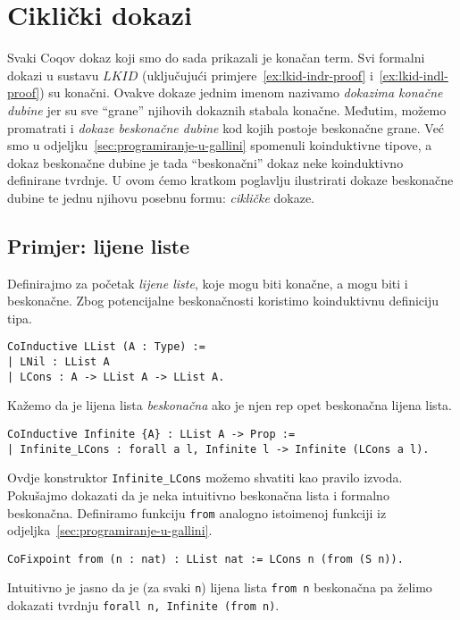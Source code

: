 \chapter{Ciklički dokazi}\label{cha:cikliki-dokazi}
Svaki Coqov dokaz koji smo do sada prikazali je konačan term.
Svi formalni dokazi u sustavu \(\mathit{LKID}\) (uključujući primjere~\ref{ex:lkid-indr-proof} i~\ref{ex:lkid-indl-proof}) su konačni.
Ovakve dokaze jednim imenom nazivamo \textit{dokazima konačne dubine}
jer su sve \enquote{grane} njihovih dokaznih stabala konačne.
Međutim, možemo promatrati i \textit{dokaze beskonačne dubine} kod kojih postoje beskonačne grane.
Već smo u odjeljku~\ref{sec:programiranje-u-gallini} spomenuli koinduktivne tipove,
a dokaz beskonačne dubine je tada \enquote{beskonačni} dokaz neke koinduktivno definirane tvrdnje.
U ovom ćemo kratkom poglavlju ilustrirati dokaze beskonačne dubine te jednu njihovu posebnu formu:
\textit{cikličke} dokaze.

\section{Primjer: lijene liste}
Definirajmo za početak \textit{lijene liste}, koje mogu biti konačne, a mogu biti i beskonačne.
Zbog potencijalne beskonačnosti koristimo koinduktivnu definiciju tipa.
\begin{verbatim}
CoInductive LList (A : Type) :=
| LNil : LList A
| LCons : A -> LList A -> LList A.
\end{verbatim}
\noindent Kažemo da je lijena lista \textit{beskonačna} ako je njen rep opet beskonačna lijena lista.
\begin{verbatim}
CoInductive Infinite {A} : LList A -> Prop :=
| Infinite_LCons : forall a l, Infinite l -> Infinite (LCons a l).
\end{verbatim}
\noindent Ovdje konstruktor \texttt{Infinite\_LCons} možemo shvatiti kao pravilo izvoda.
Pokušajmo dokazati da je neka intuitivno beskonačna lista i formalno beskonačna.
Definiramo funkciju \texttt{from} analogno istoimenoj funkciji iz odjeljka~\ref{sec:programiranje-u-gallini}.
\begin{verbatim}
CoFixpoint from (n : nat) : LList nat := LCons n (from (S n)).
\end{verbatim}
\noindent Intuitivno je jasno da je (za svaki \texttt{n}) lijena lista \texttt{from n}
beskonačna pa želimo dokazati tvrdnju \texttt{forall n, Infinite (from n)}.

